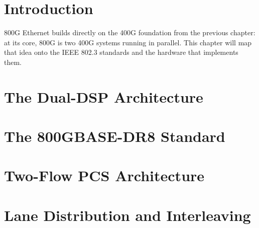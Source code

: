 \documentclass[openany]{tufte-book}
\begin{document}

\section{Introduction}

800G Ethernet builds directly on the 400G foundation from the previous chapter:
at its core, 800G is two 400G systems running in parallel. This chapter will
map that idea onto the IEEE 802.3 standards and the hardware that implements
them.


\section{The Dual-DSP Architecture}


\section{The 800GBASE-DR8 Standard}


\section{Two-Flow PCS Architecture}


\section{Lane Distribution and Interleaving}

\end{document}
